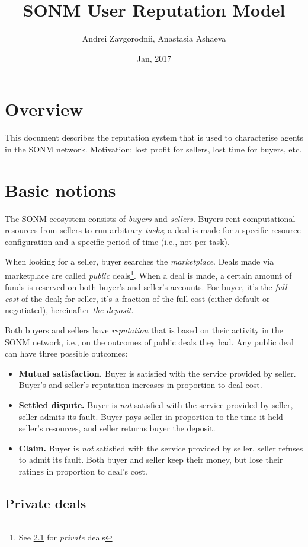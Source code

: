 \documentclass[11pt]{article}
\title{SONM User Reputation Model}
\author{Andrei Zavgorodnii, Anastasia Ashaeva}
\date{Jan, 2017}
\begin{document}
\maketitle
\tableofcontents
 
\section{Overview}

This document describes the reputation system that is used to characterise agents in the SONM network. Motivation: lost profit for sellers, lost time for buyers, etc.

\section{Basic notions}

The SONM ecosystem consists of \textit{buyers} and \textit{sellers}. Buyers rent computational resources from sellers to run arbitrary \textit{tasks}; a deal is made for a specific resource configuration and a specific period of time (i.e., not per task).

When looking for a seller, buyer searches the \textit{marketplace}. Deals made via marketplace are called \textit{public} deals\footnote{See \ref{privateDeals} for \textit{private} deals}. When a deal is made, a certain amount of funds is reserved on both buyer's and seller's accounts. For buyer, it's the \textit{full cost} of the deal; for seller, it's a fraction of the full cost (either default or negotiated), hereinafter \textit{the deposit}.

Both buyers and sellers have \textit{reputation} that is based on their activity in the SONM network, i.e., on the outcomes of public deals they had. Any public deal can have three possible outcomes:

\begin{itemize}
\item \textbf{Mutual satisfaction.} Buyer is satisfied with the service provided by seller. Buyer's and seller's reputation increases in proportion to deal cost.
\item \textbf{Settled dispute.} Buyer is \textit{not} satisfied with the service provided by seller, seller admits its fault. Buyer pays seller in proportion to the time it held seller's resources, and seller returns buyer the deposit.
\item \textbf{Claim.} Buyer is \textit{not} satisfied with the service provided by seller, seller refuses to admit its fault. Both buyer and seller keep their money, but lose their ratings in proportion to deal's cost.
\end{itemize}

\subsection{Private deals} \label{privateDeals}
\end{document}

